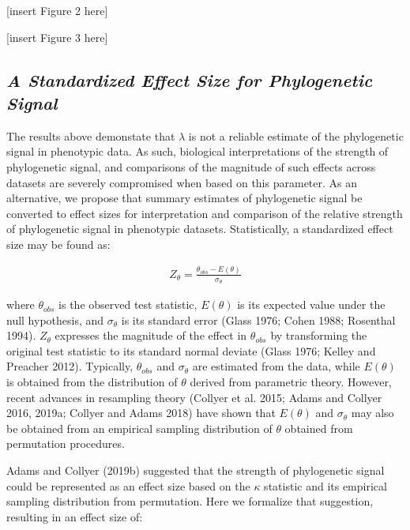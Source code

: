 \documentclass[
]{article}
\begin{document}
{{[}insert Figure 2 here{]} \hfill\break

{[}insert Figure 3 here{]} \hfill\break 

\hypertarget{a-standardized-effect-size-for-phylogenetic-signal}{%
\subsection{\texorpdfstring{\emph{A Standardized Effect Size for
Phylogenetic
Signal}}{A Standardized Effect Size for Phylogenetic Signal}}\label{a-standardized-effect-size-for-phylogenetic-signal}}

The results above demonstate that \(\lambda\) is not a reliable estimate
of the phylogenetic signal in phenotypic data. As such, biological
interpretations of the strength of phylogenetic signal, and comparisons
of the magnitude of such effects across datasets are severely
compromised when based on this parameter. As an alternative, we propose
that summary estimates of phylogenetic signal be converted to effect
sizes for interpretation and comparison of the relative strength of
phylogenetic signal in phenotypic datasets. Statistically, a
standardized effect size may be found as:

\begin{align}
    Z_{\theta}=\frac{\theta_{obs}-E(\theta)}{\sigma_\theta}
\end{align}

where \(\theta_{obs}\) is the observed test statistic, \(E(\theta)\) is
its expected value under the null hypothesis, and \(\sigma_\theta\) is
its standard error (Glass 1976; Cohen 1988; Rosenthal 1994).
\(Z_{\theta}\) expresses the magnitude of the effect in \(\theta_{obs}\)
by transforming the original test statistic to its standard normal
deviate (Glass 1976; Kelley and Preacher 2012). Typically,
\(\theta_{obs}\) and \(\sigma_\theta\) are estimated from the data,
while \(E(\theta)\) is obtained from the distribution of \(\theta\)
derived from parametric theory. However, recent advances in resampling
theory (Collyer et al. 2015; Adams and Collyer 2016, 2019a; Collyer and
Adams 2018) have shown that \(E(\theta)\) and \(\sigma_\theta\) may also
be obtained from an empirical sampling distribution of \(\theta\)
obtained from permutation procedures. \hfill\break

Adams and Collyer (2019b) suggested that the strength of phylogenetic
signal could be represented as an effect size based on the \(\kappa\)
statistic and its empirical sampling distribution from permutation. Here
we formalize that suggestion, resulting in an effect size of:

}
\end{document}
